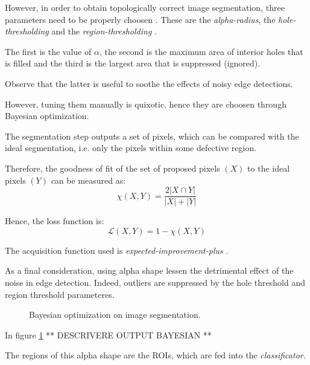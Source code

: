         \par{
            However, in order to obtain topologically correct image segmentation, three parameters need to be properly choosen \cite{springer:10.1007/11907350_46}. These are the \emph{alpha-radius}, the \emph{hole-thresholding} and the \emph{region-thresholding} \cite{matlab:alpha-shape}.
        }
        \par{
            The first is the value of $\alpha$, the second is the maximum area of interior holes that is filled and the third is the largest area that is suppressed (ignored).
        }
        \par{
            Observe that the latter is useful to soothe the effects of noisy edge detections.
        }
        \par{
            However, tuning them manually is quixotic, hence they are choosen through Bayesian optimization.
        }
        \par{
            The segmentation step outputs a set of pixels, which can be compared with the ideal segmentation, i.e. only the pixels within some defective region.
        }
        \par{
            Therefore, the goodness of fit of the set of proposed pixels $\left(X\right)$ to the ideal pixels $\left(Y\right)$ can be measured as:
            \begin{equation*}
                \chi\left(X, Y\right) = \frac{2 \lvert X \cap Y \rvert}{\lvert X \rvert + \lvert Y \rvert}
            \end{equation*}
        }
        \par{
            Hence, the loss function is:
            \begin{equation*}
                \mathcal{L}\left(X, Y\right) = 1 - \chi\left(X, Y\right)
            \end{equation*}
        }
        \par{
            The acquisition function used is \emph{expected-improvement-plus} \cite{matlab:acquisition}.
        }
        \par{
            As a final consideration, using alpha shape lessen the detrimental effect of the noise in edge detection. Indeed, outliers are suppressed by the hole threshold and region threshold parameteres.
        }
        \begin{figure}
            \caption{Bayesian optimization on image segmentation.}\label{fig:image-segmentation-optimization}
        \end{figure}
        \par{
            In figure \ref{fig:image-segmentation-optimization} ** DESCRIVERE OUTPUT BAYESIAN **
        }
        \par{
            The regions of this alpha shape are the ROIs, which are fed into the \emph{classificator}.
        }
